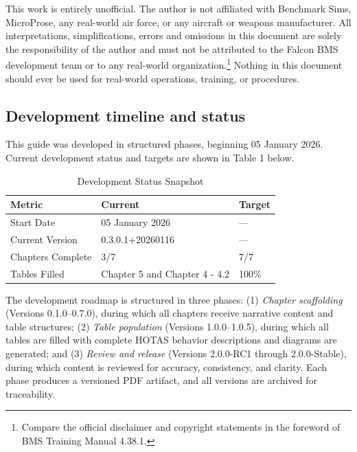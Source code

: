\documentclass[11pt,a4paper]{article}
\providecommand{\trnman}{BMS Training Manual 4.38.1}
\newcommand{\docversion}{0.3.0.1} %
\newcommand{\docbuild}{20260116}
\newcommand{\docstartdate}{05 January 2026}
\newcommand{\chapterscompletedof}{3/7}
\newcommand{\tablesfilledpct}{Chapter 5 and Chapter 4 - 4.2}
\newcommand{\fulldocversion}{\docversion+\docbuild} %
\begin{document}
This work is entirely unofficial. The author is not affiliated with Benchmark Sims, MicroProse, any real-world air force, or any aircraft or weapons manufacturer. All interpretations, simplifications, errors and omissions in this document are solely the responsibility of the author and must not be attributed to the Falcon BMS development team or to any real-world organization.\footnote{Compare the official disclaimer and copyright statements in the foreword of \trnman{}.} Nothing in this document should ever be used for real-world operations, training, or procedures.

\subsection{Development timeline and status}

This guide was developed in structured phases, beginning \docstartdate{}. Current development status and targets are shown in Table 1 below.

\begin{table}[h]
\centering
\caption{Development Status Snapshot}
\begin{tabular}{L{3.2cm} L{2.5cm} L{2.5cm}}
\toprule
\textbf{Metric} & \textbf{Current} & \textbf{Target} \\
\midrule
Start Date & \docstartdate & --- \\
Current Version & \fulldocversion & --- \\
Chapters Complete & \chapterscompletedof & 7/7 \\
Tables Filled & \tablesfilledpct & 100\% \\
\bottomrule
\end{tabular}
\end{table}

The development roadmap is structured in three phases: (1) \emph{Chapter scaffolding} (Versions 0.1.0--0.7.0), during which all chapters receive narrative content and table structures; (2) \emph{Table population} (Versions 1.0.0--1.0.5), during which all tables are filled with complete HOTAS behavior descriptions and diagrams are generated; and (3) \emph{Review and release} (Versions 2.0.0-RC1 through 2.0.0-Stable), during which content is reviewed for accuracy, consistency, and clarity. Each phase produces a versioned PDF artifact, and all versions are archived for traceability.
\end{document}

